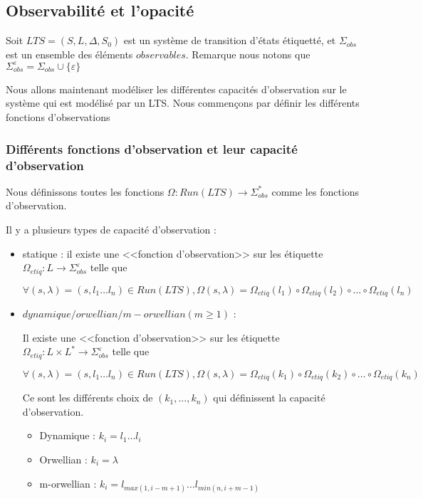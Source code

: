 \documentclass[10pt,a4paper]{article}
\begin{document}
\subsection{Observabilit\'e et l'opacit\'e}

Soit $LTS=(S,L,\Delta,S_0)$ est un syst\`eme de transition d'\'etats \'etiquett\'e, et $\Sigma_{obs}$ est un ensemble des \'el\'ements $observables$. Remarque nous notons que $\Sigma_{obs}^{\varepsilon} = \Sigma_{obs} \cup \{\varepsilon\}$

Nous allons maintenant mod\'eliser les diff\'erentes capacit\'es d'observation sur le syst\`eme qui est mod\'elis\'e par un LTS. Nous commen\c cons par d\'efinir les diff\'erents fonctions d'observations

\subsubsection{Diff\'erents fonctions d'observation et leur capacit\'e d'observation}

Nous d\'efinissons toutes les fonctions $\Omega : Run(LTS) \rightarrow \Sigma_{obs}^*$ comme les fonctions   
 d'observation.
 
Il y a plusieurs types de capacit\'e d'observation : 



\begin{itemize}
	\item statique : il existe une <<fonction d'observation>> sur les \'etiquette $\Omega_{etiq} : L \rightarrow \Sigma_{obs}^{\varepsilon}$ telle que 
	
	$$\forall (s,\lambda)= (s,l_1\dots l_n) \in Run(LTS), \Omega(s,\lambda) = \Omega_{etiq}(l_1)\circ\Omega_{etiq}(l_2)\circ\dots\circ\Omega_{etiq}(l_n)$$
	\item $dynamique/orwellian/m-orwellian(m\geq 1)$ :
		
		Il existe une <<fonction d'observation>> sur les \'etiquette $\Omega_{etiq} : L\times L^* \rightarrow \Sigma_{obs}^{\varepsilon}$ telle que 
	
	$$\forall (s,\lambda)= (s,l_1\dots l_n) \in Run(LTS), \Omega(s,\lambda) = \Omega_{etiq}(k_1)\circ\Omega_{etiq}(k_2)\circ\dots\circ\Omega_{etiq}(k_n)$$
	
	Ce sont les diff\'erents choix de $(k_1,\dots, k_n)$ qui d\'efinissent la capacit\'e d'observation.
	
	\begin{itemize}
		\item Dynamique : $k_i = l_1 \dots l_i$
		\item Orwellian : $k_i = \lambda$
		\item m-orwellian : $k_i = l_{max(1,i-m+1)} \dots l_{min(n,i+m-1)}$		
	\end{itemize}
\end{itemize}
\end{document}

